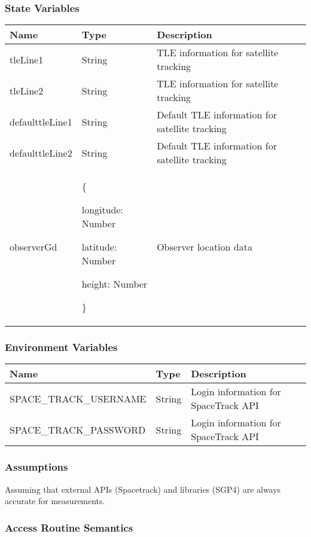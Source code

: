 \documentclass[12pt, titlepage]{article}
\begin{document}
\subsubsection{State Variables}
\begin{center}
\begin{tabular}{|p{4cm} |p{3cm} |p{5cm}|}
\hline
\textbf{Name} & \textbf{Type} & \textbf{Description} \\
\hline
tleLine1 & String & TLE information for satellite tracking \\
\hline
tleLine2 & String & TLE information for satellite tracking \\
\hline
defaulttleLine1 & String & Default TLE information for satellite tracking \\
\hline
defaulttleLine2 & String & Default TLE information for satellite tracking \\
\hline
observerGd & \{

longitude: Number

latitude: Number

height: Number

\} & Observer location data \\
\hline
\end{tabular}

\end{center}

\subsubsection{Environment Variables}
\begin{center}
\begin{tabular}{|p{7cm} |p{3cm} |p{5cm}|}
\hline
\textbf{Name} & \textbf{Type} & \textbf{Description} \\
\hline
SPACE\_TRACK\_USERNAME & String & Login information for SpaceTrack API \\
\hline
SPACE\_TRACK\_PASSWORD & String & Login information for SpaceTrack API \\
\hline
\end{tabular}
\end{center}

 
\subsubsection{Assumptions}
Assuming that external APIs (Spacetrack) and libraries (SGP4) are always accurate for measurements.

\subsubsection{Access Routine Semantics}
\end{document}
